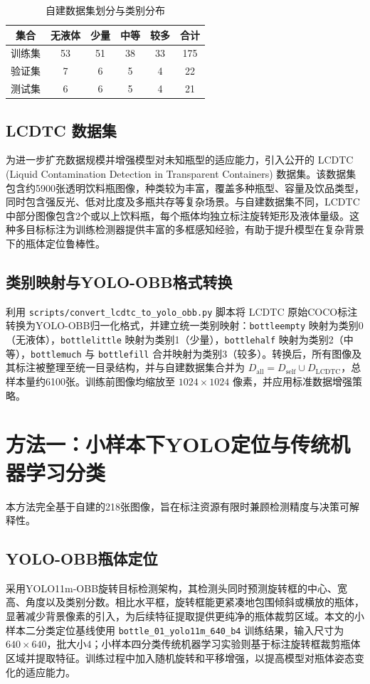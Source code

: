 \documentclass[withoutpreface,bwprint]{cumcmthesis}
\begin{document}
\begin{table}[htbp]
    \centering
    \caption{自建数据集划分与类别分布}
    \label{tab:dataset-split}
    \begin{tabular}{cccccc}
    \toprule
    集合 & 无液体 & 少量 & 中等 & 较多 & 合计 \\
    \midrule
    训练集 & 53 & 51 & 38 & 33 & 175 \\
    验证集 & 7  & 6  & 5  & 4  & 22  \\
    测试集 & 6  & 6  & 5  & 4  & 21  \\
    \bottomrule
    \end{tabular}
\end{table}

\subsection{LCDTC 数据集}
为进一步扩充数据规模并增强模型对未知瓶型的适应能力，引入公开的 LCDTC (Liquid Contamination Detection in Transparent Containers) 数据集。该数据集包含约5900张透明饮料瓶图像，种类较为丰富，覆盖多种瓶型、容量及饮品类型，同时包含强反光、低对比度及多瓶共存等复杂场景。与自建数据集不同，LCDTC中部分图像包含2个或以上饮料瓶，每个瓶体均独立标注旋转矩形及液体量级。这种多目标标注为训练检测器提供丰富的多框感知经验，有助于提升模型在复杂背景下的瓶体定位鲁棒性。

\subsection{类别映射与YOLO-OBB格式转换}
利用 \texttt{scripts/convert\_lcdtc\_to\_yolo\_obb.py} 脚本将 LCDTC 原始COCO标注转换为YOLO-OBB归一化格式，并建立统一类别映射：\texttt{bottleempty} 映射为类别0（无液体），\texttt{bottlelittle} 映射为类别1（少量），\texttt{bottlehalf} 映射为类别2（中等），\texttt{bottlemuch} 与 \texttt{bottlefill} 合并映射为类别3（较多）。转换后，所有图像及其标注被整理至统一目录结构，并与自建数据集合并为 $D_{\text{all}} = D_{\text{self}} \cup D_{\text{LCDTC}}$，总样本量约6100张。训练前图像均缩放至 $1024\times1024$ 像素，并应用标准数据增强策略。

\section{方法一：小样本下YOLO定位与传统机器学习分类}
本方法完全基于自建的218张图像，旨在标注资源有限时兼顾检测精度与决策可解释性。
\subsection{YOLO-OBB瓶体定位}
采用YOLO11m-OBB旋转目标检测架构，其检测头同时预测旋转框的中心、宽高、角度以及类别分数。相比水平框，旋转框能更紧凑地包围倾斜或横放的瓶体，显著减少背景像素的引入，为后续特征提取提供更纯净的瓶体裁剪区域。本文的小样本二分类定位基线使用 \texttt{bottle\_01\_yolo11m\_640\_b4} 训练结果，输入尺寸为 $640\times640$，批大小4；小样本四分类传统机器学习实验则基于标注旋转框裁剪瓶体区域并提取特征。训练过程中加入随机旋转和平移增强，以提高模型对瓶体姿态变化的适应能力。
\end{document}
